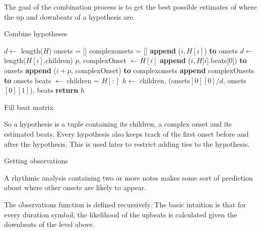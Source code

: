 The goal of the combination process is to get the best possible estimates of where the up and downbeats of a hypothesis are. 
\begin{algorithm}
\caption{Combine hypotheses}
\label{alg:hypotheses}
\begin{algorithmic}
	\State $d \leftarrow$ length($H$)
	\State onsets = []
	\State complexonsets = []
			\State \textbf{append} ($i, H[i]$) \textbf{to} onsets
		\EndIf
			\State $d \leftarrow$ length($H[i]$.children)
			\State $p$, complexOnset $\leftarrow H[i]$
				\State \textbf{append} ($i, H[i$].beats[0]) \textbf{to} onsets
			\Else
				\State \textbf{append} ($i + p$, complexOnset) \textbf{to} complexonsets
			\EndIf
		\EndIf
	\EndFor
		\State \textbf{append} complexOnsets \textbf{to} onsets
	\EndIf
	\State beats $\leftarrow$ 
	\State children = $H[:]$
	\State $h \leftarrow$ children, (onsets$[0][0]/d$, onsets$[0][1]$), beats
	\State \textbf{return} $h$
\EndFunction
\end{algorithmic}
\end{algorithm}

\begin{algorithm}
\caption{Fill beat matrix}
\label{alg:hypotheses}
\begin{algorithmic}
\EndFunction
\end{algorithmic}
\end{algorithm}

So a hypothesis is a tuple containing its children, a complex onset and its estimated beats.
Every hypothesis also keeps track of the first onset before and after the hypothesis. This is used later to restrict adding ties to the hypothesis.

Getting observations


A rhythmic analysis containing two or more notes makes some sort of prediction about where other onsets are likely to appear. 

The observations function is defined recursively. The basic intuition is that for every duration symbol, the likelihood of the upbeats is calculated given the downbeats of the level above. 

